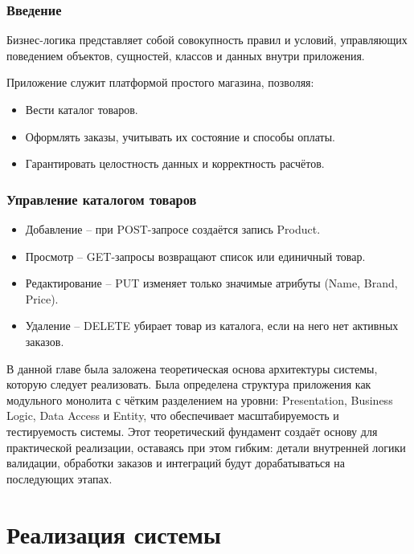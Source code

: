 \documentclass[a4paper,12pt]{report}
\begin{document}
\subsection{Введение}

Бизнес-логика представляет собой совокупность правил и условий, управляющих поведением объектов, сущностей, классов и данных внутри приложения.

Приложение служит платформой простого магазина, позволяя:
\begin{itemize}
    \item
        Вести каталог товаров.
    \item
        Оформлять заказы, учитывать их состояние и способы оплаты.
    \item
        Гарантировать целостность данных и корректность расчётов.
\end{itemize}

\subsection{Управление каталогом  товаров}

\begin{itemize}
    \item
        Добавление -- при POST-запросе создаётся запись Product.
    \item 
        Просмотр -- GET-запросы возвращают список или единичный товар.
    \item   
        Редактирование -- PUT изменяет только значимые атрибуты (Name, Brand, Price).
    \item
        Удаление -- DELETE убирает товар из каталога, если на него нет активных заказов.
\end{itemize}


В данной главе была заложена теоретическая основа архитектуры системы, которую следует реализовать. 
Была определена структура приложения как модульного монолита с чётким разделением на уровни: 
Presentation, Business Logic, Data Access и Entity, что обеспечивает масштабируемость и тестируемость системы.
Этот теоретический фундамент создаёт основу для практической реализации, оставаясь при этом гибким: 
детали внутренней логики валидации, обработки заказов и интеграций будут дорабатываться на последующих этапах.

\chapter{Реализация системы}\label{implementation_chapter_title}
\end{document}
